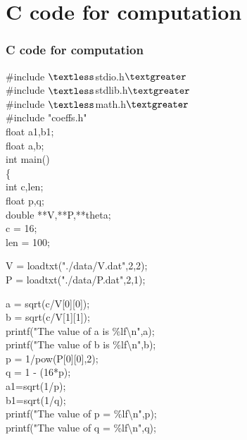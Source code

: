\documentclass{beamer}
\theoremstyle{remark}
\numberwithin{equation}{section}
\begin{document}
\section{C code for computation}
\begin{frame}[t]
\frametitle{C code for computation}
$\#$include $\textless$stdio.h$\textgreater$\\
$\#$include $\textless$stdlib.h$\textgreater$\\
$\#$include $\textless$math.h$\textgreater$\\
$\#$include "coeffs.h"\\
\vspace{14pt}
float a1,b1;\\
float a,b;\\
int main()\\
\{\\
int c,len;\\
float p,q;\\
double **V,**P,**theta;\\
\vspace{20pt}
c = 16;\\
len = 100;\\
\vspace{14pt}
\end{frame}
\begin{frame}
V = loadtxt("./data/V.dat",2,2);\\
P = loadtxt("./data/P.dat",2,1);\\
\vspace{10pt}

a = sqrt(c/V[0][0]);\\
b = sqrt(c/V[1][1]);\\
\vspace{10pt}
printf("The value of a is \%lf\textbackslash n",a);\\
printf("The value of b is \%lf\textbackslash n",b);\\

\vspace{10pt}
p = 1/pow(P[0][0],2);\\
q = 1 - (16*p);\\
\vspace{10pt}
a1=sqrt(1/p);\\
b1=sqrt(1/q);\\
\vspace{10pt}
printf("The value of p = \%lf\textbackslash n",p);\\
printf("The value of q = \%lf\textbackslash n",q);\\

\end{frame}
\end{document}

